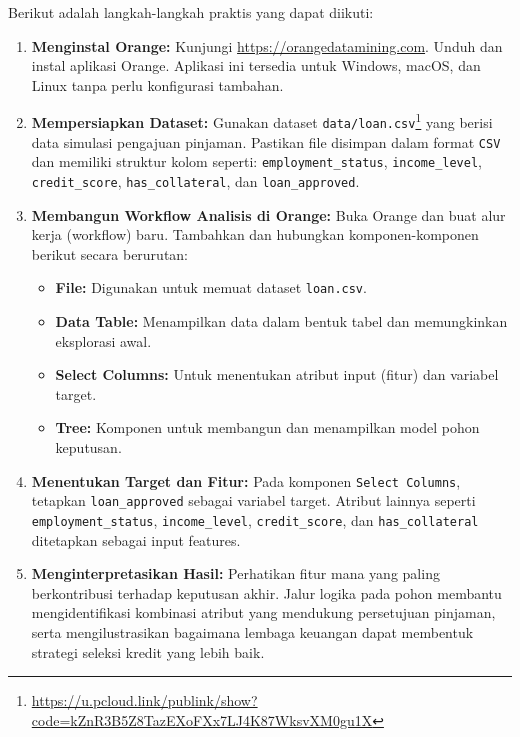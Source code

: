 Berikut adalah langkah-langkah praktis yang dapat diikuti:

\begin{enumerate}
	\item \textbf{Menginstal Orange:} 
	Kunjungi \url{https://orangedatamining.com}. Unduh dan instal aplikasi Orange. Aplikasi ini tersedia untuk Windows, macOS, dan Linux tanpa perlu konfigurasi tambahan.
	
	\item \textbf{Mempersiapkan Dataset:} 
	Gunakan dataset \texttt{data/loan.csv}\footnote{\url{https://u.pcloud.link/publink/show?code=kZnR3B5Z8TazEXoFXx7LJ4K87WksvXM0gu1X}} yang berisi data simulasi pengajuan pinjaman. Pastikan file disimpan dalam format \texttt{CSV} dan memiliki struktur kolom seperti: \texttt{employment\_status}, \texttt{income\_level}, \texttt{credit\_score}, \texttt{has\_collateral}, dan \texttt{loan\_approved}.
	
	\item \textbf{Membangun Workflow Analisis di Orange:}
	Buka Orange dan buat alur kerja (workflow) baru. Tambahkan dan hubungkan komponen-komponen berikut secara berurutan:
	\begin{itemize}
		\item \textbf{File:} Digunakan untuk memuat dataset \texttt{loan.csv}.
		\item \textbf{Data Table:} Menampilkan data dalam bentuk tabel dan memungkinkan eksplorasi awal.
		\item \textbf{Select Columns:} Untuk menentukan atribut input (fitur) dan variabel target.
		\item \textbf{Tree:} Komponen untuk membangun dan menampilkan model pohon keputusan.
	\end{itemize}
	
	\item \textbf{Menentukan Target dan Fitur:} 
	Pada komponen \texttt{Select Columns}, tetapkan \texttt{loan\_approved} sebagai variabel target. Atribut lainnya seperti \texttt{employment\_status}, \texttt{income\_level}, \texttt{credit\_score}, dan \texttt{has\_collateral} ditetapkan sebagai input features.
	
	\item \textbf{Menginterpretasikan Hasil:}
	Perhatikan fitur mana yang paling berkontribusi terhadap keputusan akhir. Jalur logika pada pohon membantu mengidentifikasi kombinasi atribut yang mendukung persetujuan pinjaman, serta mengilustrasikan bagaimana lembaga keuangan dapat membentuk strategi seleksi kredit yang lebih baik.
\end{enumerate}

